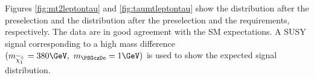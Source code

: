 


Figures \ref{fig:mt2leptontau} and \ref{fig:taumtleptontau} show the \mttwo distribution after the preselection and the \tauMT 
distribution after the preselection and the \mttwo requirements, respectively.
The data are in good agreement with the SM expectations. A SUSY signal corresponding to a high mass difference 
 $(m_{\chione}=380\GeV,~m_{\PSGczDo}=1\GeV)$ is used to show the expected signal distribution.

